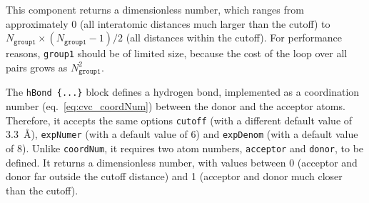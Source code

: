 \begin{cvcoptions}
\item %
\item %
\item %
\item %
\item %
\item %
\item %
\end{cvcoptions}

This component returns a dimensionless number, which ranges from
approximately 0 (all interatomic distances much larger than the
cutoff) to $N_{\mathtt{group1}} \times (N_{\mathtt{group1}} - 1) / 2$ (all
distances within the cutoff).  For performance reasons,
\texttt{group1} should be of limited size, because the cost of the
loop over all pairs grows as $N_{\mathtt{group1}}^2$.




The \texttt{hBond \{...\}} block defines a hydrogen
bond, implemented as a coordination number (eq.~\ref{eq:cvc_coordNum})
between the donor and the acceptor atoms.  Therefore, it accepts the
same options \texttt{cutoff} (with a different default value of
3.3~\AA{}), \texttt{expNumer} (with a default value of 6) and
\texttt{expDenom} (with a default value of 8).  Unlike
\texttt{coordNum}, it requires two atom numbers, \texttt{acceptor} and
\texttt{donor}, to be defined.  It returns a dimensionless number,
with values between 0 (acceptor and donor far outside the cutoff
distance) and 1 (acceptor and donor much closer than the cutoff).

